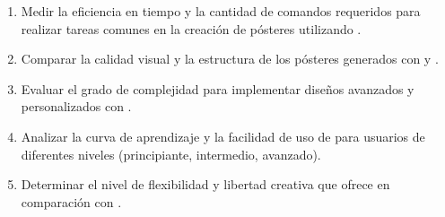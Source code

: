 \begin{enumerate}[leftmargin=0.4cm,label=\protect\circled{\arabic*}]
    \item Medir la eficiencia en tiempo y la cantidad de comandos requeridos para realizar tareas comunes en la creación de pósteres utilizando .
    \item Comparar la calidad visual y la estructura de los pósteres generados con  y .
    \item Evaluar el grado de complejidad para implementar diseños avanzados y personalizados con .
    \item Analizar la curva de aprendizaje y la facilidad de uso de  para usuarios de diferentes niveles (principiante, intermedio, avanzado).
    \item Determinar el nivel de flexibilidad y libertad creativa que ofrece  en comparación con .
\end{enumerate}
